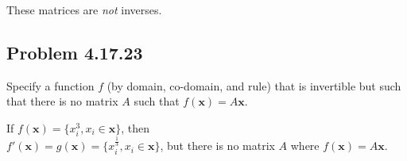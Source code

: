 \documentclass[
  letterpaper,
  DIV=11,
  numbers=noendperiod]{scrartcl}
\begin{document}
These matrices are \emph{not} inverses.

\hypertarget{problem-4.17.23}{%
\subsection{Problem 4.17.23}\label{problem-4.17.23}}

Specify a function \(f\) (by domain, co-domain, and rule) that is
invertible but such that there is no matrix \(A\) such that
\(f(\bm{x}) = A\bm{x}\).

If \(f(\bm{x}) = \{x_i^3, x_i \in \bm{x}\}\), then\\
\(f'(\bm{x}) = g(\bm{x}) = \{x_i^\frac{1}{3}, x_i \in \bm{x}\}\), but
there is no matrix \(A\) where \(f(\bm{x}) = A\bm{x}\).
\end{document}
